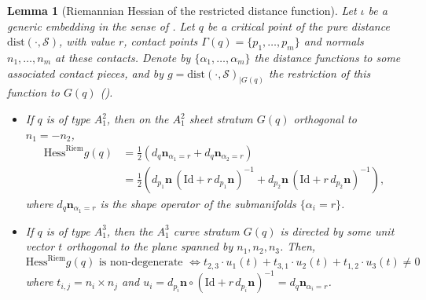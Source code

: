 \documentclass[11pt]{article}
\newcommand{\io}{\iota}
\newcommand{\nbf}{\mathbf{n}}
\newcommand{\dist}{\mathrm{dist}}
\newcommand{\Surf}{\mathcal{S}}
\newcommand{\Hess}{\mathrm{Hess}}
\newcommand{\Id}{\mathrm{Id}}
\theoremstyle{plain}
\newtheorem{lem}{Lemma}
\theoremstyle{definition}
\theoremstyle{remark}
\begin{document}
	\begin{lem}[Riemannian Hessian of the restricted distance function]
		\label{lem:riem_hess}
		Let $\io$ be a generic embedding in the sense of . Let $q$ be a critical point of the pure distance $\dist(\cdot, \Surf)$, with value $r$, contact points $\Gamma(q) = \{p_1,\ldots,p_m\}$ and normals $n_1,\ldots,n_m$ at these contacts. Denote by $\{\alpha_1,\ldots,\alpha_m\}$ the distance functions to some associated contact pieces, and by $g = \dist(\cdot, \Surf)_{|G(q)}$ the restriction of this function to $G(q)$ ().
		\begin{itemize}
			\item If $q$ is of type $A_1^2$, then on the $A_1^2$ sheet stratum $G(q)$ orthogonal to $n_1 = - n_2$,
			\begin{align}
				\Hess^{\mathrm{Riem}} g(q) &= \frac{1}{2} (d_q \nbf_{\alpha_1 = r} + d_q \nbf_{\alpha_2 = r}) \\
				&= \frac{1}{2} \left( d_{p_1} \nbf \, (\Id + r \, d_{p_1} \nbf )^{-1} + d_{p_2} \nbf \, (\Id + r \, d_{p_2} \nbf )^{-1} \right),
			\end{align}
			where $d_q \nbf_{\alpha_1 = r}$ is the shape operator of the submanifolds $\{\alpha_i = r\}$.
			\item If $q$ is of type $A_1^3$, then the $A_1^3$ curve stratum $G(q)$ is directed by some unit vector $t$ orthogonal to the \textit{plane} spanned by $n_1,n_2,n_3$. Then,
			\begin{equation*}
				\Hess^{\mathrm{Riem}} g(q) \text{ is non-degenerate } \Leftrightarrow t_{2,3} \cdot u_1(t) + t_{3,1} \cdot u_2(t) + t_{1,2} \cdot u_3(t) \neq 0
			\end{equation*}
			where $t_{i,j} = n_i \times n_j$ and $u_i = d_{p_i} \nbf \circ (\Id + r \, d_{p_i} \nbf)^{-1} = d_q \nbf_{\alpha_i = r}$.
		\end{itemize}
	\end{lem}
\end{document}
